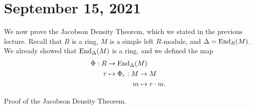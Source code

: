 \section{September 15, 2021}

We now prove the Jacobson Density Theorem, which we stated in the previous lecture. Recall that 
$R$ is a ring, $M$ is a simple left $R$-module, and $\Delta = \operatorname{End}_R(M)$. We already showed that 
$\operatorname{End}_\Delta(M)$ is a ring, and we defined the map 
\begin{align*}
    \Phi : R &\to \operatorname{End}_\Delta(M) \\
    r &\mapsto \Phi_r : M \to M \\
    & \hspace{1.33cm} m \mapsto r \cdot m.
\end{align*}

{\sc Proof of the Jacobson Density Theorem.}
